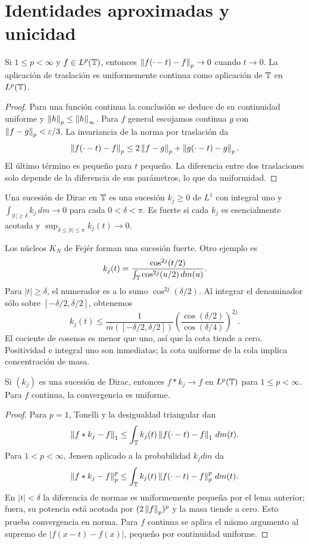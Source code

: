 \section{Identidades aproximadas y unicidad}
\begin{lema}\label{v4:traslacion-T}
Si $1\leq p<\infty$ y $f\in L^p(\mathbb T)$, entonces $\left\lVert f(\cdot-t)-f\right\rVert_p\to0$ cuando $t\to0$. La aplicación de traslación es uniformemente continua como aplicación de $\mathbb T$ en $L^p(\mathbb T)$.
\end{lema}
\begin{proof}
Para una función continua la conclusión se deduce de su continuidad uniforme y $\left\lVert h\right\rVert_p\leq\left\lVert h\right\rVert_\infty$. Para $f$ general escojamos continua $g$ con $\left\lVert f-g\right\rVert_p<\varepsilon/3$. La invariancia de la norma por traslación da
\[
 \left\lVert f(\cdot-t)-f\right\rVert_p\leq2\left\lVert f-g\right\rVert_p+\left\lVert g(\cdot-t)-g\right\rVert_p.
\]
El último término es pequeño para $t$ pequeño. La diferencia entre dos traslaciones solo depende de la diferencia de sus parámetros, lo que da uniformidad.
\end{proof}
\begin{definicion}
Una sucesión de Dirac en $\mathbb T$ es una sucesión $k_j\geq0$ de $L^1$ con integral uno y $\int_{|t|\geq\delta}k_j\,dm\to0$ para cada $0<\delta<\pi$. Es fuerte si cada $k_j$ es esencialmente acotada y $\sup_{\delta\leq|t|\leq\pi}k_j(t)\to0$.
\end{definicion}
\begin{ejemplo}
Los núcleos $K_N$ de Fejér forman una sucesión fuerte. Otro ejemplo es
\[
 k_j(t)=\frac{\cos^{2j}(t/2)}{\int_\mathbb T\cos^{2j}(u/2)\,dm(u)}.
\]
Para $|t|\geq\delta$, el numerador es a lo sumo $\cos^{2j}(\delta/2)$. Al integrar el denominador sólo sobre $[-\delta/2,\delta/2]$, obtenemos
\[
 k_j(t)\leq\frac1{m([-\delta/2,\delta/2])}
 \left(\frac{\cos(\delta/2)}{\cos(\delta/4)}\right)^{2j}.
\]
El cociente de cosenos es menor que uno, así que la cota tiende a cero. Positividad e integral uno son inmediatas; la cota uniforme de la cola implica concentración de masa.
\end{ejemplo}
\begin{teorema}\label{v4:dirac-T}
Si $(k_j)$ es una sucesión de Dirac, entonces $f*k_j\to f$ en $L^p(\mathbb T)$ para $1\leq p<\infty$. Para $f$ continua, la convergencia es uniforme.
\end{teorema}
\begin{proof}
Para $p=1$, Tonelli y la desigualdad triangular dan
\[
 \left\lVert f*k_j-f\right\rVert_1\leq\int_\mathbb T k_j(t)\left\lVert f(\cdot-t)-f\right\rVert_1\,dm(t).
\]
Para $1<p<\infty$, Jensen aplicado a la probabilidad $k_jdm$ da
\[
 \left\lVert f*k_j-f\right\rVert_p^p\leq\int_\mathbb T k_j(t)\left\lVert f(\cdot-t)-f\right\rVert_p^p\,dm(t).
\]
En $|t|<\delta$ la diferencia de normas es uniformemente pequeña por el lema anterior; fuera, su potencia está acotada por $(2\left\lVert f\right\rVert_p)^p$ y la masa tiende a cero. Esto prueba convergencia en norma. Para $f$ continua se aplica el mismo argumento al supremo de $|f(x-t)-f(x)|$, pequeño por continuidad uniforme.
\end{proof}
